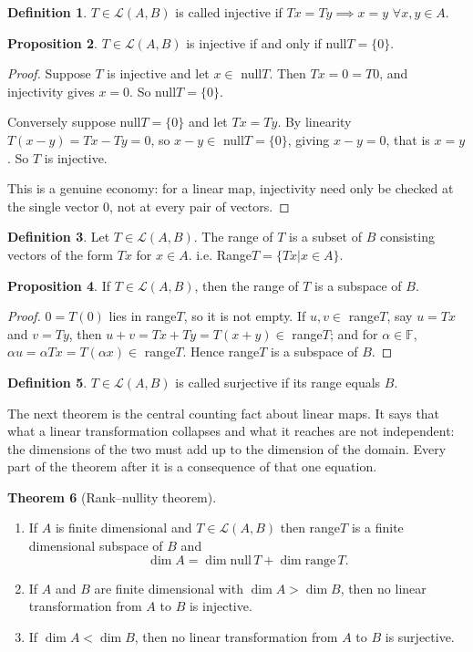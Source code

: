 \documentclass[11pt,a4paper]{article}
\theoremstyle{definition}
\newtheorem{thm}{Theorem}[subsection]
\newtheorem{defn}[thm]{Definition}
\newtheorem{prop}[thm]{Proposition}
\begin{document}
\begin{defn}
$T\in \mathcal{L}(A,B)$ is called injective if $Tx=Ty\implies x=y$ $\forall x,y\in A$.
\end{defn}


\begin{prop}\label{prop:injective-null}
$T\in \mathcal{L}(A,B)$ is injective if and only if null$T=\{0\}$.
\end{prop}

\begin{proof}
Suppose $T$ is injective and let $x\in$ null$T$. Then $Tx=0=T0$, and
injectivity gives $x=0$. So null$T=\{0\}$.

Conversely suppose null$T=\{0\}$ and let $Tx=Ty$. By linearity
$T(x-y)=Tx-Ty=0$, so $x-y\in$ null$T=\{0\}$, giving $x-y=0$, that is $x=y$.
So $T$ is injective.

This is a genuine economy: for a linear map, injectivity need only be checked
at the single vector $0$, not at every pair of vectors.
\end{proof}


\begin{defn}
Let $T\in \mathcal{L}(A,B)$. The range of $T$ is a subset of $B$ consisting vectors of the form $Tx$ for $x\in A$. i.e. Range$T=\{Tx|x\in A\}$.
\end{defn}


\begin{prop}
If $T\in \mathcal{L}(A,B)$, then the range of $T$ is a subspace of $B$.
\end{prop}

\begin{proof}
$0=T(0)$ lies in range$T$, so it is not empty. If $u,v\in$ range$T$, say
$u=Tx$ and $v=Ty$, then $u+v=Tx+Ty=T(x+y)\in$ range$T$; and for
$\alpha\in\mathbb{F}$, $\alpha u=\alpha Tx=T(\alpha x)\in$ range$T$. Hence
range$T$ is a subspace of $B$.
\end{proof}


\begin{defn}
$T\in \mathcal{L}(A,B)$ is called surjective if its range equals $B$.
\end{defn}

The next theorem is the central counting fact about linear maps. It says that
what a linear transformation collapses and what it reaches are not independent:
the dimensions of the two must add up to the dimension of the domain. Every
part of the theorem after it is a consequence of that one equation.

\begin{thm}[Rank--nullity theorem]\label{thm:rank-nullity}
\begin{enumerate}
\item[i.] If $A$ is finite dimensional and $T\in \mathcal{L}(A,B)$ then
range$T$ is a finite dimensional subspace of $B$ and
$$\dim A=\dim \text{null}\,T+\dim \text{range}\,T.$$
\item[ii.] If $A$ and $B$ are finite dimensional with $\dim A> \dim B$, then no
linear transformation from $A$ to $B$ is injective.
\item[iii.] If $\dim A<\dim B$, then no linear transformation from $A$ to $B$
is surjective.
\end{enumerate}
\end{thm}
\end{document}
